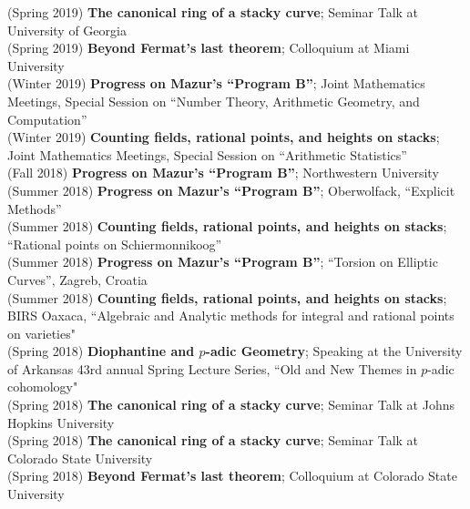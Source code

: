 \documentclass[margin,line]{res}
\begin{document}
\begin{resume}
(Spring 2019) \textbf{The canonical ring of a stacky curve};  
Seminar Talk at University of Georgia
\vspace{.05cm}\\
(Spring 2019) \textbf{Beyond Fermat's last theorem};
Colloquium at Miami University 
\vspace{.05cm}\\
(Winter 2019) \textbf{Progress on Mazur's ``Program B''};  
Joint Mathematics Meetings, Special Session on ``Number Theory, Arithmetic Geometry, and Computation''
\vspace{.05cm}\\
(Winter 2019) \textbf{Counting fields, rational points, and heights on stacks};
Joint Mathematics Meetings, Special Session on ``Arithmetic Statistics''
\vspace{.05cm}\\
(Fall 2018) \textbf{Progress on Mazur's ``Program B''};  
Northwestern University
\vspace{.05cm}\\
(Summer 2018) \textbf{Progress on Mazur's ``Program B''};  
Oberwolfack, ``Explicit Methods''
\vspace{.05cm}\\
(Summer 2018) \textbf{Counting fields, rational points, and heights on stacks};
``Rational points on Schiermonnikoog''
\vspace{.05cm}\\
(Summer 2018) \textbf{Progress on Mazur's ``Program B''};  
``Torsion on Elliptic Curves'', Zagreb, Croatia
\vspace{.05cm}\\
(Summer 2018) \textbf{Counting fields, rational points, and heights on stacks};
BIRS Oaxaca, ``Algebraic and Analytic methods for integral and rational points on varieties"
\vspace{.05cm}\\
(Spring 2018) \textbf{Diophantine and $p$-adic Geometry};
Speaking at the University of Arkansas 43rd annual Spring Lecture Series, ``Old and New Themes in $p$-adic cohomology"
\vspace{.05cm}\\
(Spring 2018) \textbf{The canonical ring of a stacky curve};  
Seminar Talk at Johns Hopkins University
\\
(Spring 2018) \textbf{The canonical ring of a stacky curve};  
Seminar Talk at Colorado State University
\\
(Spring 2018) \textbf{Beyond Fermat's last theorem};
Colloquium at Colorado State University 

\end{resume}
\end{document}
